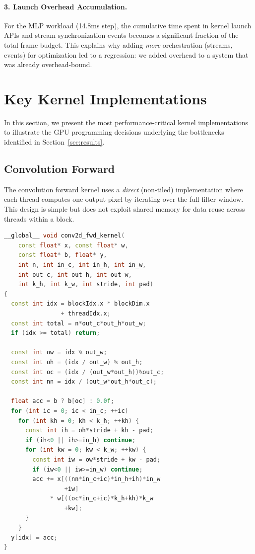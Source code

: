 \documentclass[10pt,twocolumn,letterpaper]{article}
\begin{document}
\paragraph{3. Launch Overhead Accumulation.}
For the MLP workload (14.8ms step), the cumulative time spent in kernel launch APIs and stream synchronization events becomes a significant fraction of the total frame budget.
This explains why adding \emph{more} orchestration (streams, events) for optimization led to a regression: we added overhead to a system that was already overhead-bound.

\section{Key Kernel Implementations}
\label{sec:kernels_detail}

In this section, we present the most performance-critical kernel implementations to illustrate the GPU programming decisions underlying the bottlenecks identified in Section~\ref{sec:results}.

\subsection{Convolution Forward}

The convolution forward kernel uses a \emph{direct} (non-tiled) implementation where each thread computes one output pixel by iterating over the full filter window.
This design is simple but does not exploit shared memory for data reuse across threads within a block.

\begin{lstlisting}[language=C++, caption={Direct convolution forward kernel.}, label={lst:conv_fwd}]
__global__ void conv2d_fwd_kernel(
    const float* x, const float* w,
    const float* b, float* y,
    int n, int in_c, int in_h, int in_w,
    int out_c, int out_h, int out_w,
    int k_h, int k_w, int stride, int pad)
{
  const int idx = blockIdx.x * blockDim.x
                + threadIdx.x;
  const int total = n*out_c*out_h*out_w;
  if (idx >= total) return;

  const int ow = idx % out_w;
  const int oh = (idx / out_w) % out_h;
  const int oc = (idx / (out_w*out_h))%out_c;
  const int nn = idx / (out_w*out_h*out_c);

  float acc = b ? b[oc] : 0.0f;
  for (int ic = 0; ic < in_c; ++ic)
    for (int kh = 0; kh < k_h; ++kh) {
      const int ih = oh*stride + kh - pad;
      if (ih<0 || ih>=in_h) continue;
      for (int kw = 0; kw < k_w; ++kw) {
        const int iw = ow*stride + kw - pad;
        if (iw<0 || iw>=in_w) continue;
        acc += x[((nn*in_c+ic)*in_h+ih)*in_w
                 +iw]
             * w[((oc*in_c+ic)*k_h+kh)*k_w
                 +kw];
      }
    }
  y[idx] = acc;
}
\end{lstlisting}
\end{document}

